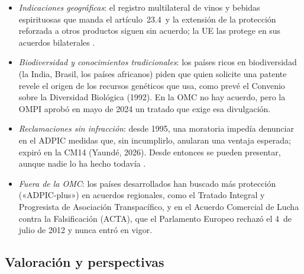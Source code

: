\documentclass[11pt]{article}
\begin{document}
\begin{itemize}
\item \emph{Indicaciones geográficas}: el registro multilateral de vinos y bebidas espirituosas que manda el artículo~23.4~y la extensión de la protección reforzada a otros productos siguen sin acuerdo; la UE las protege en sus acuerdos bilaterales .
\item \emph{Biodiversidad y conocimientos tradicionales}: los países ricos en biodiversidad (la India, Brasil, los países africanos) piden que quien solicite una patente revele el origen de los recursos genéticos que usa, como prevé el Convenio sobre la Diversidad Biológica (1992). En la OMC no hay acuerdo, pero la OMPI aprobó en mayo de 2024 un tratado que exige esa divulgación\nocite{OMPI2024Tratado}.
\item \emph{Reclamaciones sin infracción}: desde 1995, una moratoria impedía denunciar en el ADPIC medidas que, sin incumplirlo, anularan una ventaja esperada; expiró en la CM14 (Yaundé, 2026)\nocite{OMC2026CM14}. Desde entonces se pueden presentar, aunque nadie lo ha hecho todavía .
\item \emph{Fuera de la OMC}: los países desarrollados han buscado más protección («ADPIC-plus») en acuerdos regionales, como el Tratado Integral y Progresista de Asociación Transpacífico, y en el Acuerdo Comercial de Lucha contra la Falsificación (ACTA), que el Parlamento Europeo rechazó el 4~de julio de 2012 y nunca entró en vigor\nocite{PE2012ACTA}.
\end{itemize}

\subsection{Valoración y perspectivas}\label{sec:adpic-valoracion}
\end{document}
